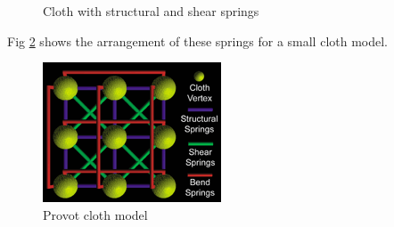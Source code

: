 \begin{figure}
\centering
{}
\caption[Cloth with structural and shear springs]{Cloth with structural and shear springs \parencite[2]{Lander2000}}
\label{fig:structural and shear}
\end{figure}

Fig \ref{fig:provot model} shows the arrangement of these springs for a small cloth model.
\begin{figure}[tp]
   \begin{center}
     \includegraphics{Figures/provot_mesh_structure.png}
   \end{center}
   \caption[Provot cloth model]{Provot cloth model \parencite[2]{Lander2000}}
   \label{fig:provot model}
\end{figure}


